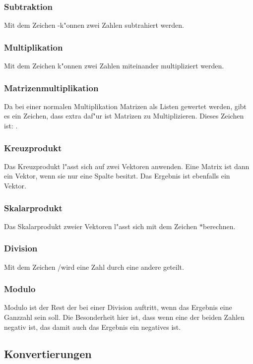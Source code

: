 \documentclass{scrartcl}
\begin{document}
\subsubsection{Subtraktion}
\label{chp:Subtraktion}
Mit dem Zeichen \glqq -\grqq  k"onnen zwei Zahlen subtrahiert werden.
\subsubsection{Multiplikation}
\label{chp:Multiplikation}
Mit dem Zeichen \glqq *\grqq  k"onnen zwei Zahlen miteinander multipliziert werden.
\subsubsection{Matrizenmultiplikation}
\label{chp:Matrizenmultiplikation}
Da bei einer normalen Multiplikation Matrizen als Listen gewertet werden, gibt es ein Zeichen, dass extra daf"ur ist Matrizen zu Multiplizieren. Dieses Zeichen ist: \glqq {}\grqq.
\subsubsection{Kreuzprodukt}
Das Kreuzprodukt l"asst sich auf zwei Vektoren anwenden. Eine Matrix ist dann ein Vektor, wenn sie nur eine Spalte besitzt. Das Ergebnis ist ebenfalls ein Vektor.
\subsubsection{Skalarprodukt}
Das Skalarprodukt zweier Vektoren l"asst sich mit dem Zeichen \glqq \(\ast\)\grqq berechnen.
\subsubsection{Division}
\label{chp:Division}
Mit dem Zeichen \glqq /\grqq  wird eine Zahl durch eine andere geteilt.
\subsubsection{Modulo}
\label{chp:Modulo}
Modulo ist der Rest der bei einer Division auftritt, wenn das Ergebnis eine Ganzzahl sein soll. Die Besonderheit hier ist, dass wenn eine der beiden Zahlen negativ ist, das damit auch das Ergebnis ein negatives ist.
\subsection{Konvertierungen}
\end{document}
